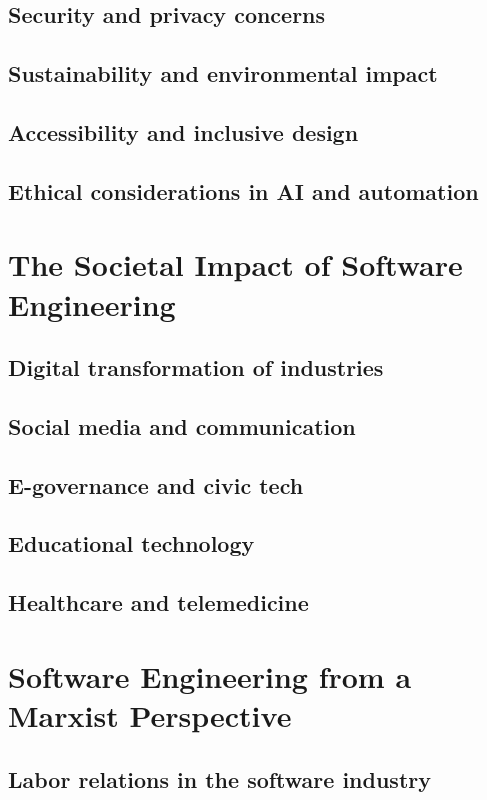 \subsection{Security and privacy concerns}
\subsection{Sustainability and environmental impact}
\subsection{Accessibility and inclusive design}
\subsection{Ethical considerations in AI and automation}

\newpage

\section{The Societal Impact of Software Engineering}
\subsection{Digital transformation of industries}
\subsection{Social media and communication}
\subsection{E-governance and civic tech}
\subsection{Educational technology}
\subsection{Healthcare and telemedicine}

\newpage

\section{Software Engineering from a Marxist Perspective}
\subsection{Labor relations in the software industry}
